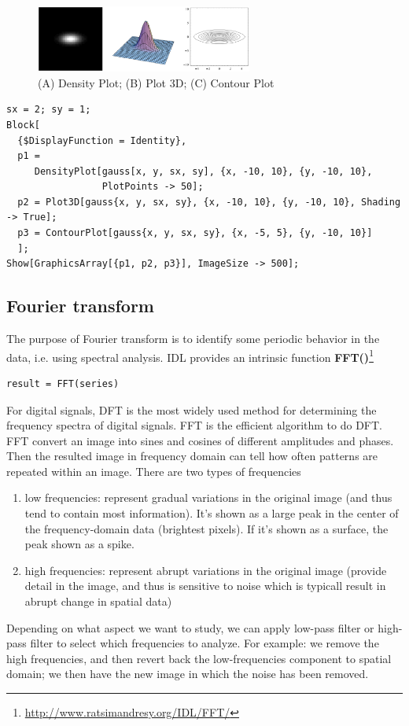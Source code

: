 \begin{figure}[hbt]
  \centerline{\includegraphics[height=2.2cm,
    angle=0]{./images/Anisotropic_Gaussian.eps}}
\caption{(A) Density Plot; (B) Plot 3D; (C) Contour Plot}
\label{fig:Anisotropic_Gaussian}
\end{figure}

\begin{verbatim}
sx = 2; sy = 1; 
Block[
  {$DisplayFunction = Identity},
  p1 =
     DensityPlot[gauss[x, y, sx, sy], {x, -10, 10}, {y, -10, 10}, 
                 PlotPoints -> 50]; 
  p2 = Plot3D[gauss{x, y, sx, sy}, {x, -10, 10}, {y, -10, 10}, Shading -> True];
  p3 = ContourPlot[gauss{x, y, sx, sy}, {x, -5, 5}, {y, -10, 10}]
  ];
Show[GraphicsArray[{p1, p2, p3}], ImageSize -> 500];
\end{verbatim}


\subsection{Fourier transform}

The purpose of Fourier transform is to identify some periodic behavior in the
data, i.e. using spectral analysis. IDL provides an intrinsic function {\bf
FFT()}\footnote{\url{http://www.ratsimandresy.org/IDL/FFT/}}
\begin{verbatim}
result = FFT(series)
\end{verbatim} 
For digital signals, DFT is the most widely used method for determining the
frequency spectra of digital signals. FFT is the efficient algorithm to do DFT.
FFT convert an image into sines and cosines of different amplitudes and phases.
Then the resulted image in frequency domain can tell how often patterns are
repeated within an image. There are two types of frequencies
\begin{enumerate}
  \item low frequencies: represent gradual variations in the original image
  (and thus tend to contain most information). It's shown as a large peak in the
  center of the frequency-domain data (brightest pixels). If it's shown as a
  surface, the peak shown as a spike. 
  
  \item high frequencies: represent abrupt variations in the original image
  (provide detail in the image, and thus is sensitive to noise which is
  typicall result in abrupt change in spatial data)
  
\end{enumerate}
Depending on what aspect we want to study, we can apply low-pass filter or
high-pass filter to select which frequencies to analyze. For example: we remove
the high frequencies, and then revert back the low-frequencies component to
spatial domain; we then have the new image in which the noise has been removed.


